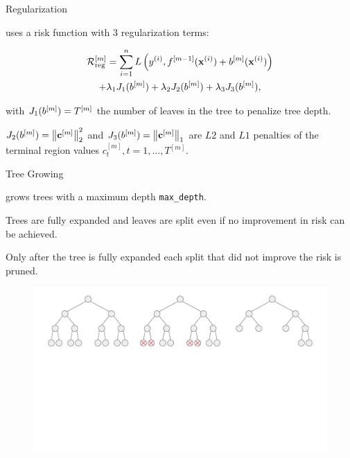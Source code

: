 \begin{frame}{Regularization}

   uses a risk function with 3 regularization terms:

  \begin{multline*}
    \mathcal{R}_{\text{reg}}^{[m]} = \sum_{i=1}^{n} L\left(y^{(i)}, f^{[m-1]}(\mathbf{x}^{(i)}) + b^{[m]}(\mathbf{x}^{(i)})\right)\\
     + \lambda_1 J_1(b^{[m]}) + \lambda_2 J_2(b^{[m]}) + \lambda_3 J_3(b^{[m]}),
  \end{multline*}

  \lz

  with $J_1(b^{[m]}) = T^{[m]}$ the number of leaves in the tree to penalize tree depth.

  \lz

  $J_2(b^{[m]}) = \left\|\mathbf{c}^{[m]}\right\|^2_2$ and $J_3(b^{[m]}) = \left\|\mathbf{c}^{[m]}\right\|_1$ are $L2$ and $L1$ penalties of the terminal region values $c_t^{[m]}, t=1,\dots,T^{[m]}$.

\end{frame}


\begin{vbframe}{Tree Growing}

   grows trees with a maximum depth \texttt{max\_depth}.

  \lz

  Trees are fully expanded and leaves are split even if no improvement in risk can be achieved.

  \lz

  Only after the tree is fully expanded each split that did not improve the risk is pruned.

  \begin{figure}
    \includegraphics[trim=0 260 230 20, clip, width=\textwidth,page=2]{figure_man/trees_balance.pdf}
  \end{figure}


\end{vbframe}

